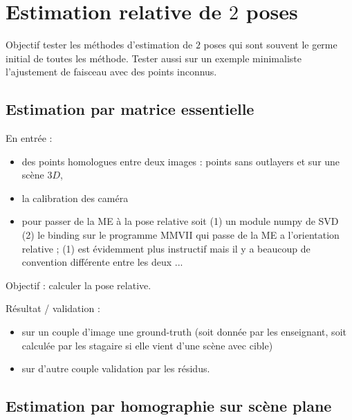 
\section{Estimation relative de $2$ poses} 

Objectif tester les méthodes d'estimation de $2$ poses qui sont 
souvent le germe initial de toutes les méthode. Tester aussi sur un
exemple minimaliste l'ajustement de faisceau avec des points inconnus.


\subsection{Estimation par matrice essentielle}

\label{TutoME}
En entrée :

\begin{itemize}
      \item  des points homologues entre deux images : points sans outlayers
              et sur une scène $3D$, 
      \item  la calibration des caméra
      \item  pour passer de la ME à la pose relative soit (1)  un module numpy de SVD
	      (2) le binding sur le programme MMVII qui passe de la ME
		a l'orientation relative  ; (1) est évidemment plus instructif
		mais il y a beaucoup de convention différente entre les deux ...
\end{itemize}

Objectif : calculer la pose relative.

Résultat / validation :

\begin{itemize}
	\item sur un couple d'image une ground-truth (soit donnée 
		par les enseignant, soit calculée par les stagaire si elle vient
		d'une scène avec cible)
      \item sur d'autre couple validation par les résidus.
\end{itemize}

\subsection{Estimation par homographie sur scène plane}

